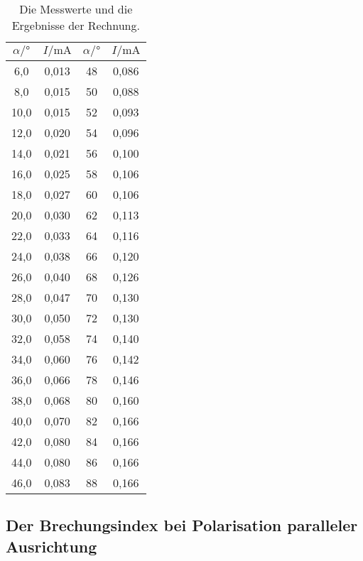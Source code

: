 \begin{table}
  \centering
  \caption{Die Messwerte und die Ergebnisse der Rechnung.}
  \label{tab:mess1}
  \begin{tabular}{c c c c}
    \toprule
    $\alpha / °$ &     $I / \unit{\milli\ampere}$ &  $\alpha / °$ &    $I / \unit{\milli\ampere}$ \\
    \midrule
       6,0 & 0,013 &  48 & 0,086 \\   
       8,0 & 0,015 &  50 & 0,088 \\
      10,0 & 0,015 &  52 & 0,093 \\
      12,0 & 0,020 &  54 & 0,096 \\
      14,0 & 0,021 &  56 & 0,100 \\
      16,0 & 0,025 &  58 & 0,106 \\
      18,0 & 0,027 &  60 & 0,106 \\
      20,0 & 0,030 &  62 & 0,113 \\
      22,0 & 0,033 &  64 & 0,116 \\
      24,0 & 0,038 &  66 & 0,120 \\
      26,0 & 0,040 &  68 & 0,126 \\
      28,0 & 0,047 &  70 & 0,130 \\
      30,0 & 0,050 &  72 & 0,130 \\
      32,0 & 0,058 &  74 & 0,140 \\
      34,0 & 0,060 &  76 & 0,142 \\
      36,0 & 0,066 &  78 & 0,146 \\
      38,0 & 0,068 &  80 & 0,160 \\
      40,0 & 0,070 &  82 & 0,166 \\
      42,0 & 0,080 &  84 & 0,166 \\
      44,0 & 0,080 &  86 & 0,166 \\
      46,0 & 0,083 &  88 & 0,166 \\    
    \bottomrule
    \end{tabular}
\end{table}


\subsection{Der Brechungsindex bei Polarisation paralleler Ausrichtung}


